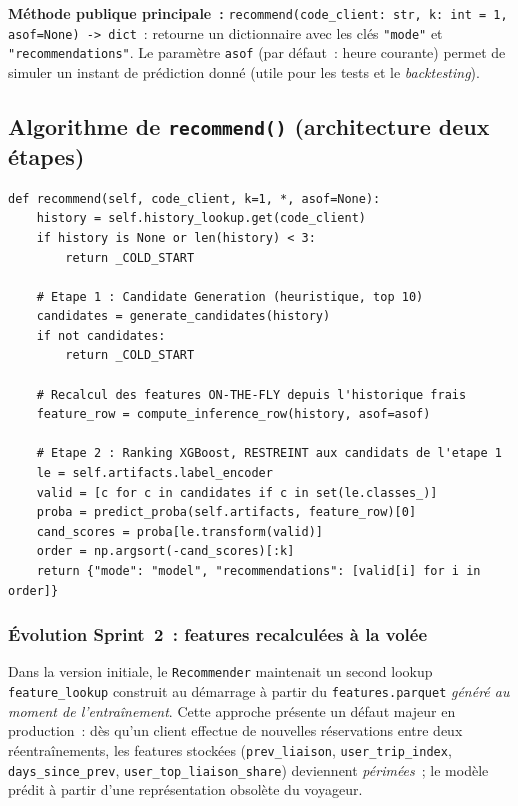 \documentclass[11pt, a4paper]{article}
\begin{document}
\textbf{Méthode publique principale~:}
\texttt{recommend(code\_client: str, k: int = 1, asof=None) -> dict}~:
retourne un dictionnaire avec les clés \texttt{"mode"} et
\texttt{"recommendations"}. Le paramètre \texttt{asof} (par défaut~:
heure courante) permet de simuler un instant de prédiction donné
(utile pour les tests et le \textit{backtesting}).

\subsection{Algorithme de \texttt{recommend()} (architecture deux étapes)}

\begin{lstlisting}[style=py, caption={Pseudo-code de \texttt{Recommender.recommend()}}]
def recommend(self, code_client, k=1, *, asof=None):
    history = self.history_lookup.get(code_client)
    if history is None or len(history) < 3:
        return _COLD_START

    # Etape 1 : Candidate Generation (heuristique, top 10)
    candidates = generate_candidates(history)
    if not candidates:
        return _COLD_START

    # Recalcul des features ON-THE-FLY depuis l'historique frais
    feature_row = compute_inference_row(history, asof=asof)

    # Etape 2 : Ranking XGBoost, RESTREINT aux candidats de l'etape 1
    le = self.artifacts.label_encoder
    valid = [c for c in candidates if c in set(le.classes_)]
    proba = predict_proba(self.artifacts, feature_row)[0]
    cand_scores = proba[le.transform(valid)]
    order = np.argsort(-cand_scores)[:k]
    return {"mode": "model", "recommendations": [valid[i] for i in order]}
\end{lstlisting}

\subsubsection*{Évolution Sprint~2~: features recalculées à la volée}

Dans la version initiale, le \texttt{Recommender} maintenait un second
lookup \texttt{feature\_lookup} construit au démarrage à partir du
\texttt{features.parquet} \textit{généré au moment de l'entraînement}.
Cette approche présente un défaut majeur en production~: dès qu'un
client effectue de nouvelles réservations entre deux réentraînements,
les features stockées (\texttt{prev\_liaison}, \texttt{user\_trip\_index},
\texttt{days\_since\_prev}, \texttt{user\_top\_liaison\_share}) deviennent
\textit{périmées}~; le modèle prédit à partir d'une représentation
obsolète du voyageur.
\end{document}

